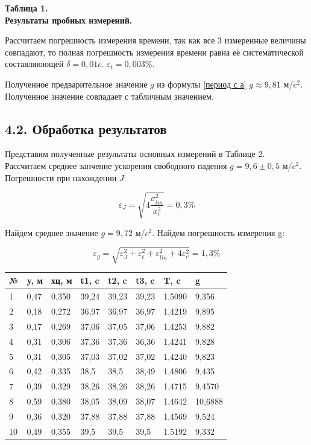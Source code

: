 \begin{flushright}
{\scriptsize \textbf{Таблица 1.}\\ \textbf {Результаты пробных измерений.}}
\end{flushright}

    Рассчитаем погрешность измерения времени, так как все 3 измеренные величины совпадают, то полная погрешность измерения времени равна её систематической составляюющей $\delta = 0,01 c$. $\varepsilon_t = 0,003\%$.

    Полученное предварительное значение $g$ из формулы \eqref{период с а} $g \approx 9,81$ м/$c^2$. Полученное значение совпадает с табличным значением.\\


\subsection*{4.2. Обработка результатов}

    Представим полученные результаты основных измерений в Таблице 2. 
    Рассчитаем среднее занчение ускорения свободного падения $g = 9,6 \pm 0,5$ м/$c^2$.
    Погрешности при нахождении $J$:

\[\varepsilon_{J} = \sqrt{4 \frac{\sigma_{lin}^2}{x_{c}^2}} = 0,3\%\]

    Найдем среднее значение $g = 9,72$ м/$c^2$.
    Найдем погрешность измерения g:
    
    \[\varepsilon_{g} = \sqrt{\varepsilon_{J}^2 + \varepsilon_{t}^2 + \varepsilon_{lin}^2 + 4\varepsilon_{c}^2} = 1,3\%\]
    
    
\begin{table}[h]
\centering
\begin{tabular}{|l|l|l|l|l|l|l|l|}
\hline
№  & y, м & хц, м & t1, c & t2, c & t3, c & T, c   & g \\ \hline
1  & 0,47 & 0,350 & 39,24 & 39,23 & 39,23 & 1,5090 & 9,356     \\ \hline
2  & 0,18 & 0,272 & 36,97 & 36,97 & 36,97 & 1,4219 & 9,895     \\ \hline
3  & 0,17 & 0,269 & 37,06 & 37,05 & 37,06 & 1,4253 & 9,882     \\ \hline
4  & 0,31 & 0,306 & 37,36 & 37,36 & 36,36 & 1,4241 & 9,828     \\ \hline
5  & 0,31 & 0,305 & 37,03 & 37,02 & 37,02 & 1,4240 & 9,823     \\ \hline
6  & 0,42 & 0,335 & 38,5  & 38,5  & 38,49 & 1,4806 & 9,435     \\ \hline
7  & 0,39 & 0,329 & 38,26 & 38,26 & 38,26 & 1,4715 & 9,4570    \\ \hline
8  & 0,59 & 0,380 & 38,05 & 38,09 & 38,07 & 1,4642 & 10,6888   \\ \hline
9  & 0,36 & 0,320 & 37,88 & 37,88 & 37,88 & 1,4569 & 9,524     \\ \hline
10 & 0,49 & 0,355 & 39,5  & 39,5  & 39,5  & 1,5192 & 9,332     \\ \hline
\end{tabular}
\end{table}

